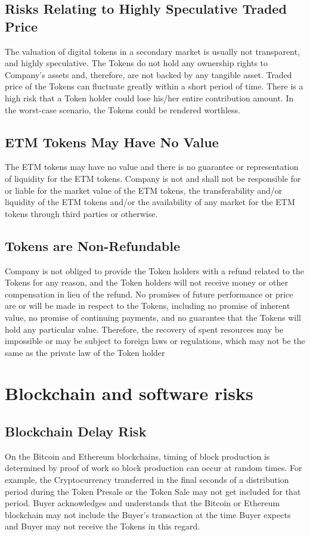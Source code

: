 \documentclass[12pt]{report}
\begin{document}
\begin{multicols}{2}
\subsection{Risks Relating to Highly Speculative Traded Price}
\label{risks-value-speculative}
The valuation of digital tokens in a secondary market is usually not transparent, and highly speculative. The Tokens do not hold any ownership rights to Company’s assets and, therefore, are not backed by any tangible asset. Traded price of the Tokens can fluctuate greatly within a short period of time. There is a high risk that a Token holder could lose his/her entire contribution amount. In the worst-case scenario, the Tokens could be rendered worthless.

\subsection{ETM Tokens May Have No Value}
\label{risks-value-no-value}
The ETM tokens may have no value and there is no guarantee or representation of liquidity for the ETM tokens. Company is not and shall not be responsible for or liable for the market value of the ETM tokens, the transferability and/or liquidity of the ETM tokens and/or the availability of any market for the ETM tokens through third parties or otherwise.

\subsection{Tokens are Non-Refundable}
\label{risks-value-non-refundable}
Company is not obliged to provide the Token holders with a refund related to the Tokens for any reason, and the Token holders will not receive money or other compensation in lieu of the refund. No promises of future performance or price are or will be made in respect to the Tokens, including no promise of inherent value, no promise of continuing payments, and no guarantee that the Tokens will hold any particular value. Therefore, the recovery of spent resources may be impossible or may be subject to foreign laws or regulations, which may not be the same as the private law of the Token holder

\section{Blockchain and software risks}
\label{risks-block}

\subsection{Blockchain Delay Risk}
\label{risks-block-delay}
On the Bitcoin and Ethereum blockchains, timing of block production is determined by proof of work so block production can occur at random times. For example, the Cryptocurrency transferred in the final seconds of a distribution period during the Token Presale or the Token Sale may not get included for that period. Buyer acknowledges and understands that the Bitcoin or Ethereum blockchain may not include the Buyer’s transaction at the time Buyer expects and Buyer may not receive the Tokens in this regard.


\end{multicols}
\end{document}
